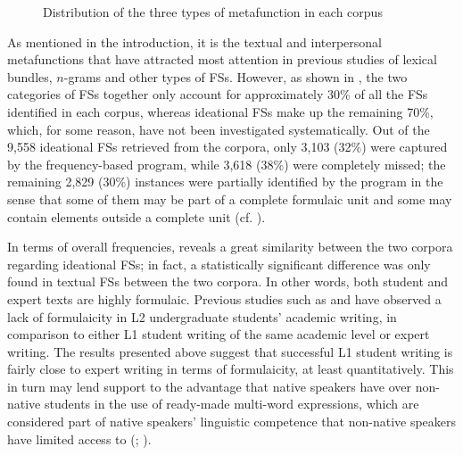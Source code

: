 \documentclass[output=paper]{langscibook}
\begin{document}
\begin{figure}
\caption{Distribution of the three types of metafunction in each corpus\label{fig:wang:1}}
\end{figure}

As mentioned in the introduction, it is the textual and interpersonal metafunctions that have attracted most attention in previous studies of lexical bundles, $n$-grams and other types of FSs. However, as shown in , the two categories of FSs together only account for approximately 30\% of all the FSs identified in each corpus, whereas ideational FSs make up the remaining 70\%, which, for some reason, have not been investigated systematically. Out of the 9,558 ideational FSs retrieved from the corpora, only 3,103 (32\%) were captured by the frequency-based program, while 3,618 (38\%) were completely missed; the remaining 2,829 (30\%) instances were partially identified by the program in the sense that some of them may be part of a complete formulaic unit and some may contain elements outside a complete unit (cf. ). 

In terms of overall frequencies,  reveals a great similarity between the two corpora regarding ideational FSs; in fact, a statistically significant difference was only found in textual FSs between the two corpora. In other words, both student and expert texts are highly formulaic. Previous studies such as \citet{ChenBaker2010} and \citet{ÄdelErman2012} have observed a lack of formulaicity in L2 undergraduate students’ academic writing, in comparison to either L1 student writing of the same academic level or expert writing. The results presented above suggest that successful L1 student writing is fairly close to expert writing in terms of formulaicity, at least quantitatively. This in turn may lend support to the advantage that native speakers have over non-native students in the use of ready-made multi-word expressions, which are considered part of native speakers’ linguistic competence that non-native speakers have limited access to (\citealt{Wray2002,Wray2008}; \citealt{Kecskes2016}).  
\end{document}
